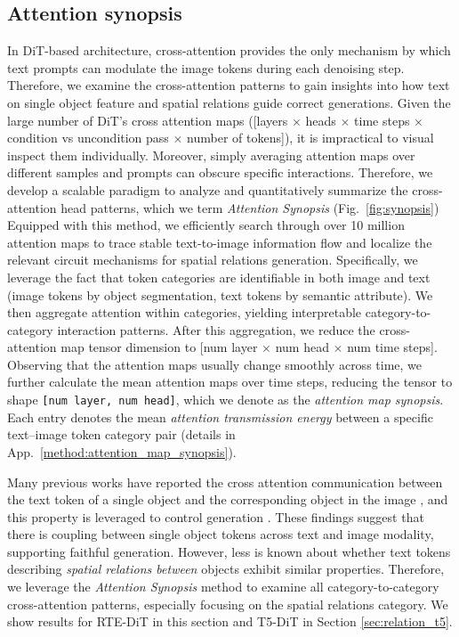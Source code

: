 \documentclass[10pt,twocolumn,letterpaper]{article}
\begin{document}
\subsection{Attention synopsis}
In DiT-based architecture, cross-attention provides the only mechanism by which text prompts can modulate the image tokens during each denoising step. Therefore, we examine the cross-attention patterns to gain insights into how text on single object feature and spatial relations guide correct generations. Given the large number of DiT's cross attention maps ([layers $\times$ heads $\times$ time steps $\times$ condition vs uncondition pass $\times$ number of tokens]), it is impractical to visual inspect them individually. Moreover, simply averaging attention maps over different samples and prompts can obscure specific interactions. Therefore, we develop a scalable paradigm to analyze and quantitatively summarize the cross-attention head patterns, which we term \textit{Attention Synopsis} (Fig.~\ref{fig:synopsis})
Equipped with this method, we efficiently search through over 10 million attention maps to trace stable text-to-image information flow and localize the relevant circuit mechanisms for spatial relations generation. Specifically, we leverage the fact that token categories are identifiable in both image and text (image tokens by object segmentation, text tokens by semantic attribute). We then aggregate attention within categories, yielding interpretable category-to-category interaction patterns. After this aggregation, we reduce the cross-attention map tensor dimension to [num layer $\times$ num head $\times$ num time steps]. 
Observing that the attention maps usually change smoothly across time, we further calculate the mean attention maps over time steps, reducing the tensor to shape \texttt{[num layer, num head]}, which we denote as the \textit{attention map synopsis}. Each entry denotes the mean \textit{attention transmission energy} between a specific text–image token category pair (details in App.~\ref{method:attention_map_synopsis}). 

Many previous works have reported the cross attention communication between the text token of a single object and the corresponding object in the image \citep{tang2022daam}, and this property is leveraged to control generation \citep{hertz2022crossAttnCtrl,liu_towards_2024}. These findings suggest that there is coupling between single object tokens across text and image modality, supporting faithful generation. However, less is known about whether text tokens describing \textit{spatial relations between} objects exhibit similar properties. Therefore, we leverage the \textit{Attention Synopsis} method to examine all category-to-category cross-attention patterns, especially focusing on the spatial relations category. We show results for RTE-DiT in this section and T5-DiT in Section \ref{sec:relation_t5}.
\end{document}
